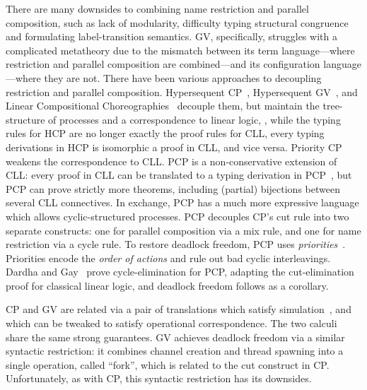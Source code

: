 There are many downsides to combining name restriction and parallel composition, such as lack of modularity, difficulty typing structural congruence and formulating label-transition semantics. GV, specifically, struggles with a complicated metatheory due to the mismatch between its term language---where restriction and parallel composition are combined---and its configuration language---where they are not. There have been various approaches to decoupling restriction and parallel composition.
Hypersequent CP~\cite[HCP]{MP18,kokkemontesi19popl,kokkemontesi19tlla}, Hypersequent GV~\cite{fowleretal21}, and Linear Compositional Choreographies~\cite{CarboneMS18} decouple them, but maintain the tree-structure of processes and a correspondence to linear logic, \eg, while the typing rules for HCP are no longer exactly the proof rules for CLL, every typing derivations in HCP is isomorphic a proof in CLL, and vice versa.
Priority CP~\cite[PCP]{dardhagay18extended} weakens the correspondence to CLL. PCP is a non-conservative extension of CLL: every proof in CLL can be translated to a typing derivation in PCP~\cite{DardhaP22}, but PCP can prove strictly more theorems, including (partial) bijections between several CLL connectives. In exchange, PCP has a much more expressive language which allows cyclic-structured processes. PCP decouples CP's cut rule into two separate constructs: one for parallel composition via a mix rule, and one for name restriction via a cycle rule. To restore deadlock freedom, PCP uses \emph{priorities}~\cite{kobayashi06,padovani14}. Priorities encode the \emph{order of actions} and rule out bad cyclic interleavings. Dardha and Gay~\cite{dardhagay18extended} prove cycle-elimination for PCP, adapting the cut-elimination proof for classical linear logic, and deadlock freedom follows as a corollary.

CP and GV are related via a pair of translations which satisfy simulation~\cite{lindleymorris16}, and which can be tweaked to satisfy operational correspondence. The two calculi share the same strong guarantees. GV achieves deadlock freedom via a similar syntactic restriction: it combines channel creation and thread spawning into a single operation, called ``fork'', which is related to the cut construct in CP. Unfortunately, as with CP, this syntactic restriction has its downsides.

